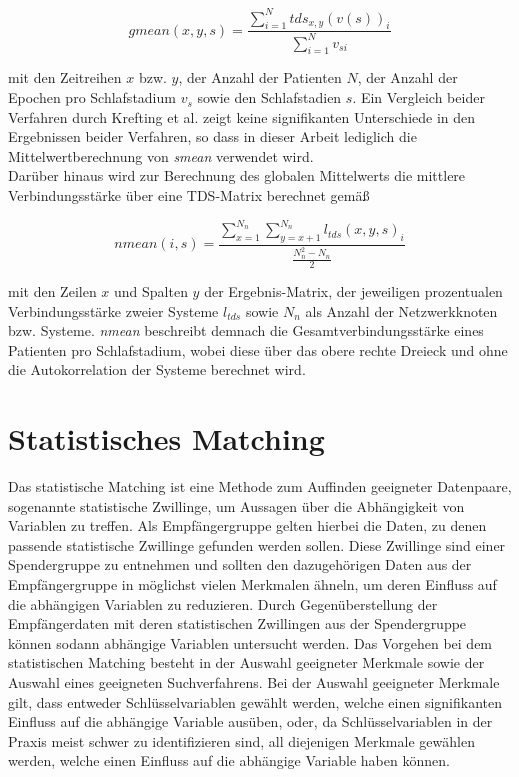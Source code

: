 \begin{equation}
gmean(x,y,s) = \frac{\sum \limits_{i=1}^N tds_{x,y}(v(s))_i}{\sum \limits_{i=1}^N v_{si}}
	\label{eq:gmean}
\end{equation}

mit den Zeitreihen $x$ bzw. $y$, der Anzahl der Patienten $N$, der Anzahl der Epochen pro Schlafstadium $v_s$ sowie den Schlafstadien $s$. Ein Vergleich beider Verfahren durch Krefting et al. zeigt keine signifikanten Unterschiede in den Ergebnissen beider Verfahren, so dass in dieser Arbeit lediglich die Mittelwertberechnung von \textit{smean} verwendet wird. \parencite{bashan_network_2012, krefting_age_2017}\\

Darüber hinaus wird zur Berechnung des globalen Mittelwerts die mittlere Verbindungsstärke über eine \acs{TDS}-Matrix berechnet gemäß

\begin{equation}
nmean(i,s) = \frac{\sum \limits_{x=1}^{N_n} \sum \limits_{y=x+1}^{N_n} l_{tds}(x,y,s)_i }{\frac{N_{n}^2 - N_n}{2}}
	\label{eq:nmean}
\end{equation}

mit den Zeilen $x$ und Spalten $y$ der Ergebnis-Matrix, der jeweiligen prozentualen Verbindungsstärke zweier Systeme $l_{tds}$ sowie $N_n$ als Anzahl der Netzwerkknoten bzw. Systeme. \textit{nmean} beschreibt demnach die Gesamtverbindungsstärke eines Patienten pro Schlafstadium, wobei diese über das obere rechte Dreieck und ohne die Autokorrelation der Systeme berechnet wird. \parencite{krefting_age_2017}

\section{Statistisches Matching}

Das statistische Matching ist eine Methode zum Auffinden geeigneter Datenpaare, sogenannte statistische Zwillinge, um Aussagen über die Abhängigkeit von Variablen zu treffen. Als Empfängergruppe gelten hierbei die Daten, zu denen passende statistische Zwillinge gefunden werden sollen. Diese Zwillinge sind einer Spendergruppe zu entnehmen und sollten den dazugehörigen Daten aus der Empfängergruppe in möglichst vielen Merkmalen ähneln, um deren Einfluss auf die abhängigen Variablen zu reduzieren. Durch Gegenüberstellung der Empfängerdaten mit deren statistischen Zwillingen aus der Spendergruppe können sodann abhängige Variablen untersucht werden. Das Vorgehen bei dem statistischen Matching besteht in der Auswahl geeigneter Merkmale sowie der Auswahl eines geeigneten Suchverfahrens. Bei der Auswahl geeigneter Merkmale gilt, dass entweder Schlüsselvariablen gewählt werden, welche einen signifikanten Einfluss auf die abhängige Variable ausüben, oder, da Schlüsselvariablen in der Praxis meist schwer zu identifizieren sind, all diejenigen Merkmale gewählen werden, welche einen Einfluss auf die abhängige Variable haben können. \parencite{weis_basiswissen_2005, bacher_statistisches_2002}\\

